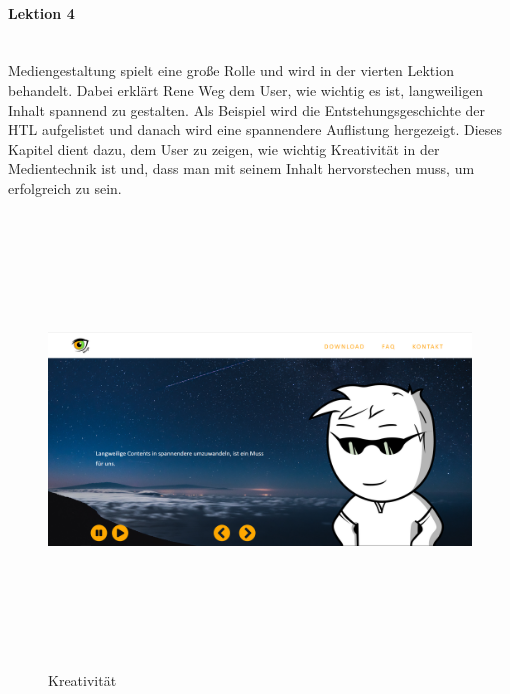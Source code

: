 \paragraph{Lektion 4} \leavevmode \\
Mediengestaltung spielt eine große Rolle und wird in der vierten Lektion behandelt. Dabei erklärt Rene Weg dem User, wie wichtig es ist, langweiligen Inhalt spannend zu gestalten. Als Beispiel wird die Entstehungsgeschichte der HTL aufgelistet und danach wird eine spannendere Auflistung hergezeigt. Dieses Kapitel dient dazu, dem User zu zeigen, wie wichtig Kreativität in der Medientechnik ist und, dass man mit seinem Inhalt hervorstechen muss, um erfolgreich zu sein.
\begin{figure}[h]
	\centering
\includegraphics[width=12cm,height=12cm,keepaspectratio]{webseite_abb15} 
	\caption{Kreativität}
\end{figure}
